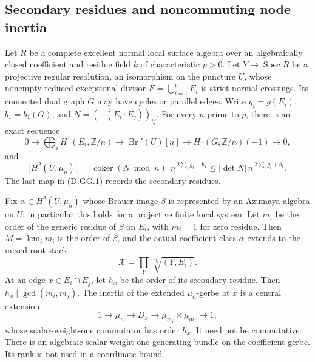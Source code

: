 \subsection{Secondary residues and noncommuting node inertia}

\begin{lemma}
\label{D:SNC-general-Brauer-geometry}
Let \(R\) be a complete excellent normal local surface algebra
over an algebraically closed coefficient and residue field \(k\)
of characteristic \(p>0\). Let \(Y\to\operatorname{Spec}R\)
be a projective regular resolution, an isomorphism on the
puncture \(U\), whose nonempty reduced exceptional divisor
\(E=\bigcup_{i=1}^{v}E_i\) is strict normal crossings.
Its connected dual graph \(G\) may have cycles or parallel
edges. Write \(g_i=g(E_i)\), \(b_1=b_1(G)\), and
\(N=(-(E_i\cdot E_j))_{ij}\).
For every \(n\) prime to \(p\), there is an exact sequence
\[
 0\longrightarrow\bigoplus_iH^1(E_i,\mathbb Z/n)
 \longrightarrow\operatorname{Br}'(U)[n]
 \longrightarrow H_1(G,\mathbb Z/n)(-1)
 \longrightarrow0,                                    \tag{D.GG.1}
\]
and
\[
 |H^2(U,\mu_n)|
 =|\operatorname{coker}(N\bmod n)|\,
       n^{\,2\sum_i g_i+b_1}
 \leq|\det N|\,n^{\,2\sum_i g_i+b_1}.                  \tag{D.GG.2}
\]
The last map in (D.GG.1) records the secondary residues.

Fix \(\alpha\in H^2(U,\mu_n)\) whose Brauer image
\(\beta\) is represented by an Azumaya algebra on \(U\);
in particular this holds for a projective finite local
system. Let \(m_i\) be the order of the generic residue
of \(\beta\) on \(E_i\), with \(m_i=1\) for zero residue.
Then \(M=\operatorname{lcm}_i m_i\) is the order of
\(\beta\), and the actual coefficient class \(\alpha\)
extends to the mixed-root stack
\[
 \mathcal X=\prod_Y\sqrt[m_i]{(Y,E_i)}.                \tag{D.GG.3}
\]
At an edge \(x\in E_i\cap E_j\), let \(h_x\) be the
order of its secondary residue. Then
\(h_x\mid\gcd(m_i,m_j)\). The inertia of the extended
\(\mu_n\)-gerbe at \(x\) is a central extension
\[
 1\longrightarrow\mu_n\longrightarrow D_x
 \longrightarrow\mu_{m_i}\times\mu_{m_j}
 \longrightarrow1,                                   \tag{D.GG.4}
\]
whose scalar-weight-one commutator has order \(h_x\).
It need not be commutative. There is an algebraic
scalar-weight-one generating bundle on the coefficient
gerbe. Its rank is not used in a coordinate bound.
\end{lemma}

